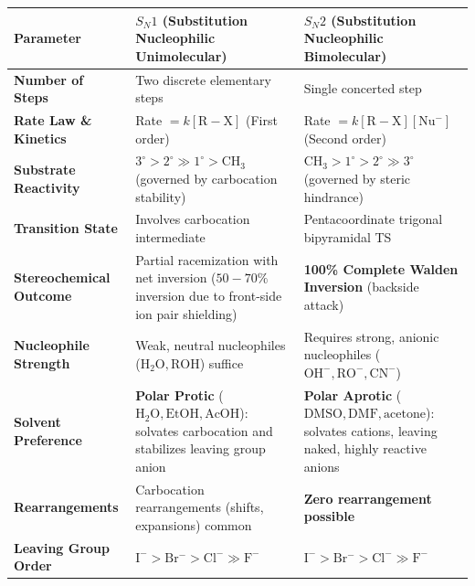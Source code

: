 \documentclass[10pt,a4paper]{article}
\begin{document}
\begin{formulabox}
\begin{tabularx}{\linewidth}{|l|Y|Y|}
\hline
\textbf{Parameter} & \textbf{\texorpdfstring{$S_N1$}{SN1} (Substitution Nucleophilic Unimolecular)} & \textbf{\texorpdfstring{$S_N2$}{SN2} (Substitution Nucleophilic Bimolecular)} \\
\hline
\textbf{Number of Steps} & Two discrete elementary steps & Single concerted step \\
\hline
\textbf{Rate Law \& Kinetics} & Rate $= k[\mathrm{R-X}]$ (First order) & Rate $= k[\mathrm{R-X}][\mathrm{Nu^-}]$ (Second order) \\
\hline
\textbf{Substrate Reactivity} & $3^\circ > 2^\circ \gg 1^\circ > \mathrm{CH_3}$ (governed by carbocation stability) & $\mathrm{CH_3} > 1^\circ > 2^\circ \gg 3^\circ$ (governed by steric hindrance) \\
\hline
\textbf{Transition State} & Involves carbocation intermediate & Pentacoordinate trigonal bipyramidal TS \\
\hline
\textbf{Stereochemical Outcome} & Partial racemization with net inversion ($50-70\%$ inversion due to front-side ion pair shielding) & \textbf{100\% Complete Walden Inversion} (backside attack) \\
\hline
\textbf{Nucleophile Strength} & Weak, neutral nucleophiles ($\mathrm{H_2O, ROH}$) suffice & Requires strong, anionic nucleophiles ($\mathrm{OH^-, RO^-, CN^-}$) \\
\hline
\textbf{Solvent Preference} & \textbf{Polar Protic} ($\mathrm{H_2O, EtOH, AcOH}$): solvates carbocation and stabilizes leaving group anion & \textbf{Polar Aprotic} ($\mathrm{DMSO, DMF, \text{acetone}}$): solvates cations, leaving naked, highly reactive anions \\
\hline
\textbf{Rearrangements} & Carbocation rearrangements (shifts, expansions) common & \textbf{Zero rearrangement possible} \\
\hline
\textbf{Leaving Group Order} & $\mathrm{I^- > Br^- > Cl^- \gg F^-}$ & $\mathrm{I^- > Br^- > Cl^- \gg F^-}$ \\
\hline
\end{tabularx}
\end{formulabox}
\end{document}
